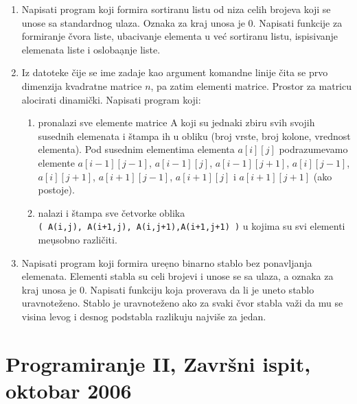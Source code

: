 \begin{enumerate}

\item
Napisati program koji formira sortiranu listu od niza celih brojeva koji se
unose sa standardnog ulaza. Oznaka za kraj unosa je $0$. Napisati funkcije za
formiranje \v cvora liste, ubacivanje elementa u ve\' c sortiranu listu,
ispisivanje elemenata liste i osloba\d anje liste.

\item
Iz datoteke \v cije se ime zadaje kao argument komandne linije
\v cita se prvo dimenzija kvadratne matrice $n$, pa zatim elementi
matrice. Prostor za matricu alocirati dinami\v cki. Napisati program
koji:
\begin{enumerate}
\item
pronalazi sve elemente matrice A koji su jednaki zbiru svih svojih susednih
elemenata i \v stampa ih u obliku (broj vrste, broj kolone, vrednost elementa).
Pod susednim elementima elementa $a[i][j]$ podrazumevamo elemente $a[i-1][j-1]$,
$a[i-1][j]$, $a[i-1][j+1]$, $a[i][j-1]$, $a[i][j+1]$, $a[i+1][j-1]$, $a[i+1][j]$ i
$a[i+1][j+1]$ (ako postoje).
\item
nalazi i \v stampa sve \v cetvorke oblika\\
\verb"( A(i,j), A(i+1,j), A(i,j+1),A(i+1,j+1) )" u kojima su svi elementi me\d usobno
razli\v citi.
\end{enumerate}

\item
Napisati program koji formira ure\d eno binarno stablo bez ponavljanja
elemenata. Elementi stabla su celi brojevi i unose se sa ulaza, a oznaka
za kraj unosa je $0$. Napisati funkciju koja proverava da li je uneto
stablo uravnote\v zeno. Stablo je uravnote\v zeno ako za svaki \v cvor
stabla va\v zi da mu se visina levog i desnog podstabla razlikuju
najvi\v se za jedan.
\end{enumerate}




\section{Programiranje II, Zavr\v{s}ni ispit, oktobar 2006}



